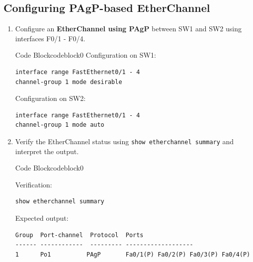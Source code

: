 \documentclass[a4paper]{article}
\begin{document}
\subsection{Configuring PAgP-based EtherChannel}
\begin{enumerate}
	\item Configure an \textbf{EtherChannel using PAgP} between SW1 and SW2 using interfaces F0/1 - F0/4.



	      \begin{ocg}{Code Block}{codeblock}{0}
		      \vspace{0.5cm}
		      Configuration on SW1:
		      \begin{lstlisting}
interface range FastEthernet0/1 - 4
channel-group 1 mode desirable
\end{lstlisting}


		      \vspace{0.5cm}
		      Configuration on SW2:
		      \begin{lstlisting}
interface range FastEthernet0/1 - 4
channel-group 1 mode auto

\end{lstlisting}

	      \end{ocg}


	\item Verify the EtherChannel status using \texttt{show etherchannel summary} and interpret the output.

	      \begin{ocg}{Code Block}{codeblock}{0}

		      \vspace{0.5cm}
		      Verification:
		      \begin{lstlisting}
show etherchannel summary
          \end{lstlisting}

		      \vspace{0.5cm}
		      Expected output:
		      \begin{lstlisting}[columns=fullflexible]
Group  Port-channel  Protocol  Ports  
------ ------------  --------- -------------------
1      Po1          PAgP       Fa0/1(P) Fa0/2(P) Fa0/3(P) Fa0/4(P)
          \end{lstlisting}


\end{ocg}
\end{enumerate}
\end{document}
